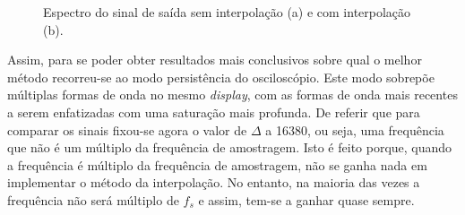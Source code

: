 \documentclass[11pt]{article}
\numberwithin{equation}{section}
\begin{document}
\begin{figure}[H]
	\centering
	\hspace{8mm}
	\vspace{-0.8em}
	\caption{Espectro do sinal de saída sem interpolação (a) e com interpolação (b).}
	\vspace{-0.8em}
\end{figure}

Assim, para se poder obter resultados mais conclusivos sobre qual o melhor método recorreu-se ao modo persistência do osciloscópio. Este modo sobrepõe múltiplas formas de onda no mesmo \textit{display}, com as formas de onda mais recentes a serem enfatizadas com uma saturação mais profunda. De referir que para comparar os sinais fixou-se agora o valor de $\Delta$ a 16380, ou seja, uma frequência que não é um múltiplo da frequência de amostragem. Isto é feito porque, quando a frequência é múltiplo da frequência de amostragem, não se ganha nada em implementar o método da interpolação. No entanto, na maioria das vezes a frequência não será múltiplo de $f_s$ e assim, tem-se a ganhar quase sempre. 
\end{document}
